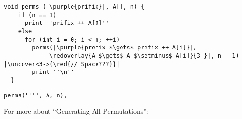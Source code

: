 \begin{frame}[fragile]{}
  \begin{lstlisting}[style = Cstyle]
  void perms (|\purple{prifix}|, A[], n) {
    if (n == 1)
      print ''prifix ++ A[0]''
    else 
      for (int i = 0; i < n; ++i)
        perms(|\purple{prefix $\gets$ prefix ++ A[i]}|, 
            |\redoverlay{A $\gets$ A $\setminus$ A[i]}{3-}|, n - 1) |\uncover<3->{\red{// Space???}}|
        print ''\n''
  }
  \end{lstlisting}

  \pause
  \begin{lstlisting}[style = Cstyle]
  perms('''', A, n);
  \end{lstlisting}
\end{frame}

\begin{frame}{}
  \centerline{\Large For more about ``Generating All Permutations'':}

  \vspace{0.30cm}
  \begin{columns}
  \end{columns}
\end{frame}
